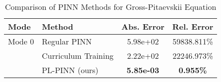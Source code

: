 \begin{table}[htbp]
\centering
\caption{Comparison of PINN Methods for Gross-Pitaevskii Equation}
\label{tab:pinn_comparison}
\begin{tabular}{llcc}
\toprule
Mode & Method & Abs. Error & Rel. Error \\
\midrule
Mode 0 & Regular PINN & 5.98e+02 & 59838.811\% \\
 & Curriculum Training & 2.22e+02 & 22246.973\% \\
 & PL-PINN (ours) & \textbf{5.85e-03} & \textbf{0.955\%} \\
\bottomrule
\end{tabular}
\end{table}